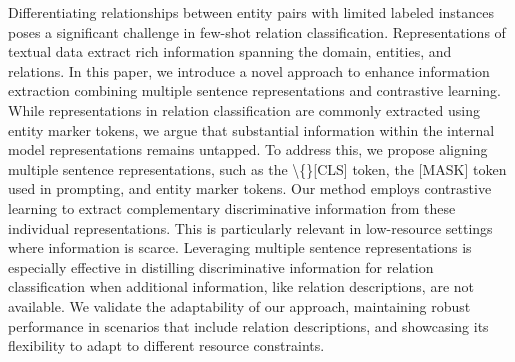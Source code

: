 Differentiating relationships between entity pairs with limited labeled instances poses a significant challenge in few-shot relation classification. Representations of textual data extract rich information spanning the domain, entities, and relations. In this paper, we introduce a novel approach to enhance information extraction combining multiple sentence representations and contrastive learning. While representations in relation classification are commonly extracted using entity marker tokens, we argue that substantial information within the internal model representations remains untapped. To address this, we propose aligning multiple sentence representations, such as the \textbackslash\{\}[CLS] token, the [MASK] token used in prompting, and entity marker tokens. Our method employs contrastive learning to extract complementary discriminative information from these individual representations. This is particularly relevant in low-resource settings where information is scarce. Leveraging multiple sentence representations is especially effective in distilling discriminative information for relation classification when additional information, like relation descriptions, are not available. We validate the adaptability of our approach, maintaining robust performance in scenarios that include relation descriptions, and showcasing its flexibility to adapt to different resource constraints.